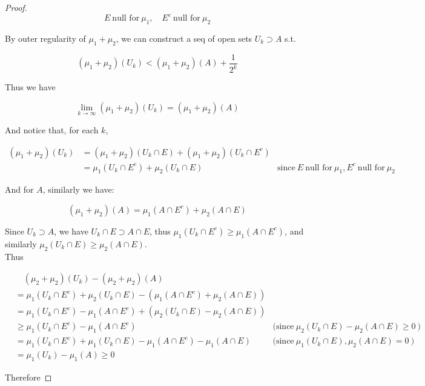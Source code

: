 \begin{proof}
\[E\ \text{null for}\ \mu_{1},\quad E^{c}\ \text{null for}\ \mu_{2}\]

By outer regularity of \(\mu_{1} + \mu_{2}\), we can construct a seq of open sets \(U_{k} \supset A\) s.t.

\[(\mu_{1} + \mu_{2})(U_{k}) < (\mu_{1} + \mu_{2})(A) + \frac{1}{2^{k}}\]

Thus we have

\[\lim\limits_{k\rightarrow\infty}(\mu_{1} + \mu_{2})(U_{k}) = (\mu_{1} + \mu_{2})(A)\]

And notice that, for each \(k\),

\[\begin{matrix}
{(\mu_{1} + \mu_{2})(U_{k})} & {= (\mu_{1} + \mu_{2})(U_{k} \cap E) + (\mu_{1} + \mu_{2})(U_{k} \cap E^{c})} & \\
 & {= \mu_{1}(U_{k} \cap E^{c}) + \mu_{2}(U_{k} \cap E)\ } & {\text{since}\ E\ \text{null for}\ \mu_{1}, E^{c}\ \text{null for}\ \mu_{2}}
\end{matrix}\]

And for \(A\), similarly we have:

\[(\mu_{1} + \mu_{2})(A) = \mu_{1}(A \cap E^{c}) + \mu_{2}(A \cap E)\]

Since \(U_{k} \supset A\), we have \(U_{k} \cap E \supset A \cap E\), thus \(\mu_{1}(U_{k} \cap E^{c}) \geq \mu_{1}(A \cap E^{c})\), and similarly \(\mu_{2}(U_{k} \cap E) \geq \mu_{2}(A \cap E)\).\\
Thus

\[\begin{matrix}
 & {\quad(\mu_{2} + \mu_{2})(U_{k}) - (\mu_{2} + \mu_{2})(A)} & \\
 & {= \mu_{1}(U_{k} \cap E^{c}) + \mu_{2}(U_{k} \cap E) - (\mu_{1}(A \cap E^{c}) + \mu_{2}(A \cap E))} & \\
 & {= \mu_{1}(U_{k} \cap E^{c}) - \mu_{1}(A \cap E^{c}) + (\mu_{2}(U_{k} \cap E) - \mu_{2}(A \cap E))} & \\
 & {\geq \mu_{1}(U_{k} \cap E^{c}) - \mu_{1}(A \cap E^{c})\ } & {\text{(since}\ \mu_{2}(U_{k} \cap E) - \mu_{2}(A \cap E) \geq 0\ \text{)}} \\
 & {= \mu_{1}(U_{k} \cap E^{c}) + \mu_{1}(U_{k} \cap E) - \mu_{1}(A \cap E^{c}) - \mu_{1}(A \cap E)\ } & {\text{(since}\ \mu_{1}(U_{k} \cap E),\mu_{2}(A \cap E) = 0\ \text{)}} \\
 & {= \mu_{1}(U_{k}) - \mu_{1}(A) \geq 0} &
\end{matrix}\]

Therefore


\end{proof}

